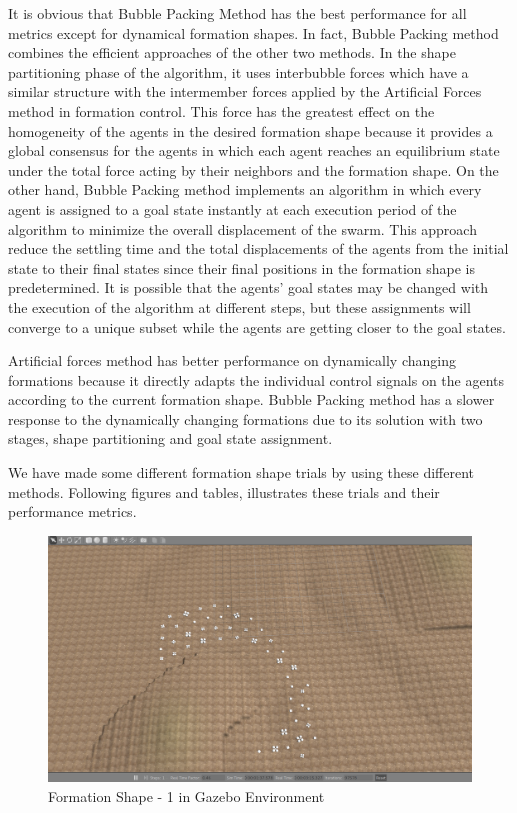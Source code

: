 It is obvious that Bubble Packing Method has the best performance for all metrics except for dynamical formation shapes. In fact, Bubble Packing method combines the efficient approaches of the other two methods. In the shape partitioning phase of the algorithm, it uses interbubble forces which have a similar structure with the intermember forces applied by the Artificial Forces method in formation control. This force has the greatest  effect on the homogeneity of the agents in the desired formation shape because it provides a global consensus for the agents in which each agent reaches an equilibrium state under the total force acting by their neighbors and the formation shape. On the other hand, Bubble Packing method implements an algorithm in which every agent is assigned to a goal state instantly at each execution period of the algorithm to minimize the overall displacement of the swarm. This approach reduce the settling time and the total displacements of the agents from the initial state to their final states since their final positions in the formation shape is predetermined. It is possible that the agents' goal states may be changed with the execution of the algorithm at different steps, but these assignments will converge to a unique subset while the agents are getting closer to the goal states. 

Artificial forces method has better performance on dynamically changing formations because it directly adapts the individual control signals on the agents according to the current formation shape. Bubble Packing method has a slower response to the dynamically changing formations due to its solution with two stages, shape partitioning and goal state assignment. 
		
We have made some different formation shape trials by using these different methods. Following figures and tables, illustrates these trials and their performance metrics.

\begin{figure}[H]
\caption{Formation Shape - 1 in Gazebo Environment}
\centerline{\includegraphics[scale = 0.32]{1_Gazebo}}
\end{figure} 
			
